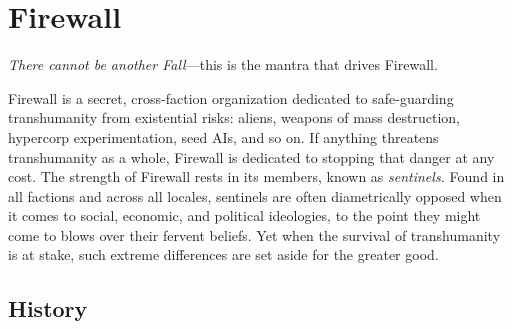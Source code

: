 \section{Firewall}

\textit{There cannot be another Fall}—this is the mantra that 
drives Firewall. 

Firewall is a secret, cross-faction organization dedicated
to safe-guarding transhumanity from existential
risks: aliens, weapons of mass destruction, hypercorp 
experimentation, seed AIs, and so on. If anything 
threatens transhumanity as a whole, Firewall is dedicated
to stopping that danger at any cost.
The strength of Firewall rests in its members, known 
as \textit{sentinels.} Found in all factions and across all locales, 
sentinels are often diametrically opposed when it comes 
to social, economic, and political ideologies, to the point 
they might come to blows over their fervent beliefs. Yet 
when the survival of transhumanity is at stake, such 
extreme differences are set aside for the greater good. 

\subsection{History}

